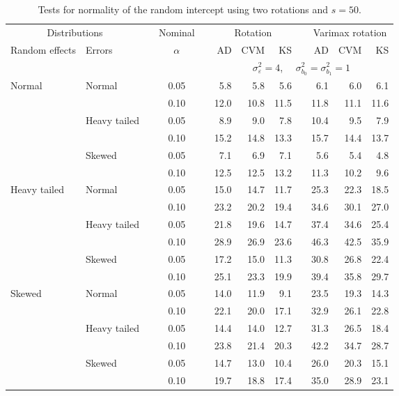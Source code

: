 \begin{table}[ht]
\caption{\label{tab:simb0s50-alt}Tests for normality of the random intercept using two rotations and $s = 50$.}
\begin{scriptsize}
\begin{center}
\begin{tabular}{ll p{.1cm} c p{.1cm} rrr p{.1cm} rrr}
  \hline
  \multicolumn{2}{c}{Distributions}& & Nominal & &  \multicolumn{3}{c}{Rotation} & & \multicolumn{3}{c}{Varimax rotation} \\ \cline{1-2} \cline{6-8} \cline{10-12}   
  Random effects & Errors & & $\alpha$ & & AD & CVM & KS & & AD & CVM & KS \\ 
   \hline
& && && \multicolumn{7}{c}{$\sigma_{\varepsilon}^2 = 4$, \ \ $\sigma_{b_0}^2 = \sigma_{b_1}^2 = 1$} \\ \cline{6-12}
Normal       & Normal       && 0.05 &&   5.8 & 5.8 & 5.6 &   & 6.1 & 6.0 & 6.1 \\ 
             &              && 0.10 &&   12.0 & 10.8 & 11.5 &   & 11.8 & 11.1 & 11.6 \\ 
             & Heavy tailed && 0.05 &&   8.9 & 9.0 & 7.8 &   & 10.4 & 9.5 & 7.9 \\ 
             &              && 0.10 &&   15.2 & 14.8 & 13.3 &   & 15.7 & 14.4 & 13.7 \\ 
             & Skewed       && 0.05 &&   7.1 & 6.9 & 7.1 &   & 5.6 & 5.4 & 4.8 \\ 
             &              && 0.10 &&   12.5 & 12.5 & 13.2 &   & 11.3 & 10.2 & 9.6 \\ 
Heavy tailed & Normal       && 0.05 &&   15.0 & 14.7 & 11.7 &   & 25.3 & 22.3 & 18.5 \\ 
             &              && 0.10 &&   23.2 & 20.2 & 19.4 &   & 34.6 & 30.1 & 27.0 \\ 
             & Heavy tailed && 0.05 &&   21.8 & 19.6 & 14.7 &   & 37.4 & 34.6 & 25.4 \\ 
             &              && 0.10 &&   28.9 & 26.9 & 23.6 &   & 46.3 & 42.5 & 35.9 \\ 
             & Skewed       && 0.05 &&   17.2 & 15.0 & 11.3 &   & 30.8 & 26.8 & 22.4 \\ 
             &              && 0.10 &&   25.1 & 23.3 & 19.9 &   & 39.4 & 35.8 & 29.7 \\ 
Skewed       & Normal       && 0.05 &&   14.0 & 11.9 & 9.1 &   & 23.5 & 19.3 & 14.3 \\ 
             &              && 0.10 &&   22.1 & 20.0 & 17.1 &   & 32.9 & 26.1 & 22.8 \\ 
             & Heavy tailed && 0.05 &&   14.4 & 14.0 & 12.7 &   & 31.3 & 26.5 & 18.4 \\ 
             &              && 0.10 &&   23.8 & 21.4 & 20.3 &   & 42.2 & 34.7 & 28.7 \\ 
             & Skewed       && 0.05 &&   14.7 & 13.0 & 10.4 &   & 26.0 & 20.3 & 15.1 \\ 
             &              && 0.10 &&   19.7 & 18.8 & 17.4 &   & 35.0 & 28.9 & 23.1 \\ 


\end{tabular}
\end{center}
\end{scriptsize}
\end{table}

